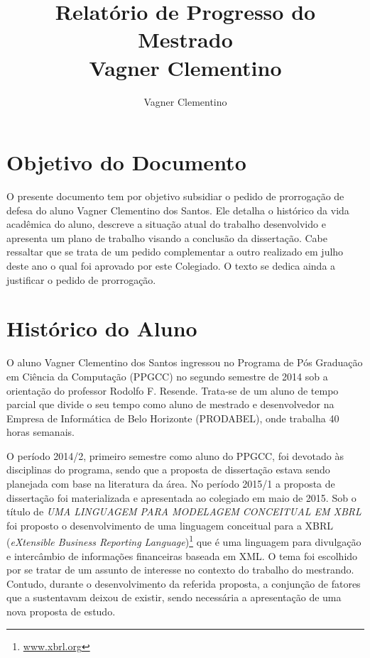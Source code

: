 \documentclass[10pt,a4paper]{report}
\author{Vagner Clementino}
\title{Relatório de Progresso do Mestrado\\
	Vagner Clementino}
\begin{document}
\maketitle

	
\section{Objetivo do Documento}
\label{sec:objetivo}

O presente documento tem por objetivo subsidiar o pedido de prorrogação de
defesa do aluno Vagner Clementino dos Santos. Ele detalha o histórico da vida
acadêmica do aluno, descreve a situação atual do trabalho desenvolvido e
apresenta um plano de trabalho visando a conclusão da dissertação. Cabe
ressaltar que se trata de um pedido complementar a outro realizado em
julho deste ano o qual foi aprovado por este Colegiado. O texto se
dedica ainda a justificar o pedido de prorrogação.

\section{Histórico do Aluno}
\label{sec:historico}

O aluno Vagner Clementino dos Santos ingressou no Programa de Pós Graduação em
Ciência da Computação (PPGCC) no segundo semestre de 2014 sob a orientação do
professor Rodolfo F. Resende. Trata-se de um aluno de tempo parcial que divide o seu tempo como aluno de mestrado e desenvolvedor na Empresa de Informática de
Belo Horizonte (PRODABEL), onde trabalha 40 horas semanais.

O período 2014/2, primeiro semestre como aluno do PPGCC, foi devotado às
disciplinas do programa, sendo que a proposta de dissertação estava sendo
planejada com base na literatura da área. No período 2015/1 a proposta de
dissertação foi materializada e apresentada ao colegiado em maio de 2015. Sob o
título de \textit{UMA LINGUAGEM PARA MODELAGEM CONCEITUAL EM XBRL} foi proposto
o desenvolvimento de uma linguagem conceitual para a XBRL (\textit{eXtensible
	Business Reporting Language})\footnote{\url{www.xbrl.org}} que é uma
linguagem para divulgação e intercâmbio de informações financeiras baseada em
XML\@. O tema foi escolhido por se tratar de um assunto de
interesse no contexto do trabalho do mestrando. Contudo, durante o desenvolvimento da referida proposta, a conjunção de fatores que
a sustentavam deixou de existir, sendo necessária a apresentação de uma nova
proposta de estudo.
\end{document}
